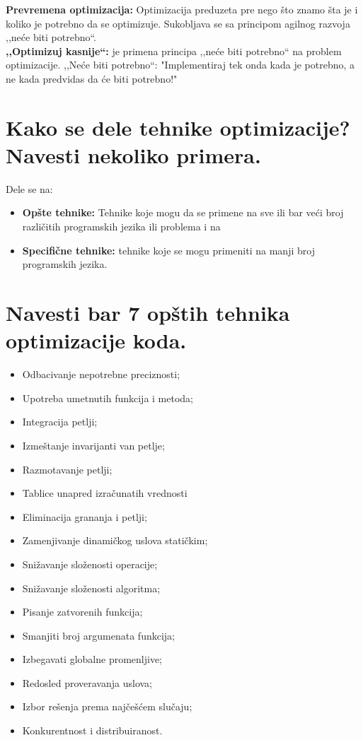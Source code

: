 \documentclass[a4paper]{article}
\begin{document}
  \textbf{Prevremena optimizacija:} Optimizacija preduzeta pre nego što znamo šta je i koliko je
  potrebno da se optimizuje. Sukobljava se sa principom agilnog razvoja ,,neće biti potrebno``.\\
  \indent \textbf{,,Optimizuj kasnije``:} je primena principa ,,neće biti potrebno`` na problem 
  optimizacije. ,,Neće biti potrebno``: "Implementiraj tek onda kada je potrebno, 
  a ne kada predvidas da će biti potrebno!"
   
\section{Kako se dele tehnike optimizacije? Navesti nekoliko primera.}
  Dele se na: 
  \begin{itemize}
    \item \textbf{Opšte tehnike:} Tehnike koje mogu da se primene na sve ili bar veći broj 
          različitih programskih jezika ili problema i na 
    \item \textbf{Specifične tehnike:} tehnike koje se mogu primeniti na manji broj programskih jezika.
  \end{itemize}
\section{Navesti bar 7 opštih tehnika optimizacije koda.}
  \begin{itemize}
    \item Odbacivanje nepotrebne preciznosti;
    \item Upotreba umetnutih funkcija i metoda;
    \item Integracija petlji;
    \item Izmeštanje invarijanti van petlje;
    \item Razmotavanje petlji;
    \item Tablice unapred izračunatih vrednosti
    \item Eliminacija grananja i petlji;
    \item Zamenjivanje dinamičkog uslova statičkim;
    \item Snižavanje složenosti operacije;
    \item Snižavanje složenosti algoritma;
    \item Pisanje zatvorenih funkcija;
    \item Smanjiti broj argumenata funkcija;
    \item Izbegavati globalne promenljive;
    \item Redosled proveravanja uslova;
    \item Izbor rešenja prema najčešćem slučaju;
    \item Konkurentnost i distribuiranost.
  \end{itemize}
\end{document}

